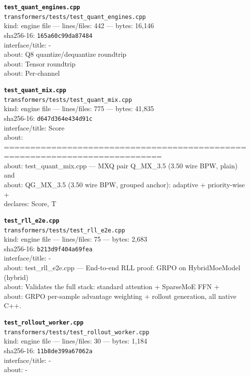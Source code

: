 \noindent\textbf{\texttt{test\_quant\_engines.cpp}}\\
\texttt{transformers/tests/test\_quant\_engines.cpp}\\
kind: engine file --- lines/files: 442 --- bytes: 16,146\\
sha256-16: \texttt{165a60c99da87484}\\
interface/title: -\\
about: Q8 quantize/dequantize roundtrip\\
about: Tensor roundtrip\\
about: Per-channel\\
\vspace*{6.0pt}

\noindent\textbf{\texttt{test\_quant\_mix.cpp}}\\
\texttt{transformers/tests/test\_quant\_mix.cpp}\\
kind: engine file --- lines/files: 775 --- bytes: 41,835\\
sha256-16: \texttt{d647d364e434d91c}\\
interface/title: Score\\
about: ============================================================================\\
about: test\_quant\_mix.cpp — MXQ pair Q\_MX\_3.5 (3.50 wire BPW, plain) and\\
about: QG\_MX\_3.5 (3.50 wire BPW, grouped anchor): adaptive + priority-wise +\\
declares: Score, T\\
\vspace*{6.0pt}

\noindent\textbf{\texttt{test\_rll\_e2e.cpp}}\\
\texttt{transformers/tests/test\_rll\_e2e.cpp}\\
kind: engine file --- lines/files: 75 --- bytes: 2,683\\
sha256-16: \texttt{b213d9f404a69fea}\\
interface/title: -\\
about: test\_rll\_e2e.cpp — End-to-end RLL proof: GRPO on HybridMoeModel (hybrid)\\
about: Validates the full stack: standard attention + SparseMoE FFN +\\
about: GRPO per-sample advantage weighting + rollout generation, all native C++.\\
\vspace*{6.0pt}

\noindent\textbf{\texttt{test\_rollout\_worker.cpp}}\\
\texttt{transformers/tests/test\_rollout\_worker.cpp}\\
kind: engine file --- lines/files: 30 --- bytes: 1,184\\
sha256-16: \texttt{11b8de399a67062a}\\
interface/title: -\\
about: -\\
\vspace*{6.0pt}
\newpage

